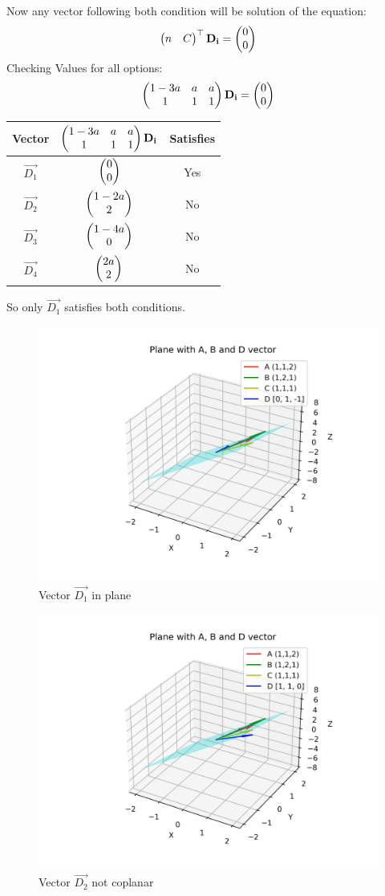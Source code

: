 \documentclass[12pt]{article}
\begin{document}
Now any vector following both condition will be solution of the equation:
\begin{align}
    \begin{pmatrix} n & C\end{pmatrix}^\top\mathbf{D_i}=\begin{pmatrix}0\\0\end{pmatrix}
\end{align}
Checking Values for all options:
\begin{align}
    \begin{pmatrix}1-3a & a & a \\ 1 & 1 &1\end{pmatrix}\mathbf{D_i}=\begin{pmatrix}0 \\ 0\end{pmatrix}
\end{align}
\begin{center}
\begin{tabular}{|c|c|c|}
\hline
Vector & $ \begin{pmatrix}1-3a & a & a \\ 1 & 1 &1\end{pmatrix}\mathbf{D_i}$ & Satisfies\\ \hline
$\vec{D_1}$ & $\begin{pmatrix}0\\0\end{pmatrix}$ & Yes \\ \hline
$\vec{D_2}$ & $\begin{pmatrix}1-2a\\2\end{pmatrix}$  & No  \\ \hline
$\vec{D_3}$ & $\begin{pmatrix}1-4a\\0\end{pmatrix}$ & No \\ \hline
$\vec{D_4}$ & $\begin{pmatrix}2a\\2\end{pmatrix}$  & No  \\ \hline
\end{tabular}
\end{center}

So only $\vec{D_1}$ satisfies both conditions.

\newpage
\begin{figure}[H]
    \centering
    \includegraphics[width=0.6\linewidth]{figures/plane_1.png}
    \caption{Vector $\vec{D_1}$ in plane}
\end{figure}

\begin{figure}[H]
    \centering
    \includegraphics[width=0.6\linewidth]{figures/plane_2.png}
    \caption{Vector $\vec{D_2}$ not coplanar}
\end{figure}
\end{document}
